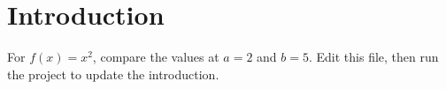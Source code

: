 \section{Introduction}
For $f(x)=x^2$, compare the values at $a=2$ and $b=5$.
Edit this file, then run the project to update the introduction.
